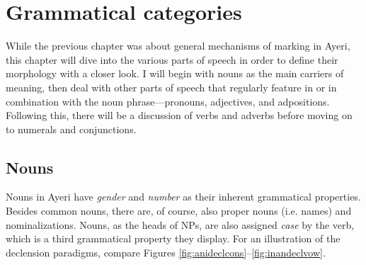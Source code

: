 
\chapter{Grammatical categories}

While the previous chapter was about general mechanisms of marking in Ayeri, 
this chapter will dive into the various parts of speech in order to define 
their morphology with a closer look. I will begin with nouns as the main 
carriers of meaning, then deal with other parts of speech that regularly 
feature in or in combination with the noun phrase---pronouns, adjectives, and 
adpositions. Following this, there will be a discussion of verbs and adverbs 
before moving on to numerals and conjunctions.

\section{Nouns}
\label{sec:nouns}

Nouns in Ayeri have \emph{gender} and \emph{number} as their inherent 
grammatical properties. Besides common nouns, there are, of course, also proper 
nouns (i.e. names) and nominalizations. Nouns, as the heads of NPs, are also 
assigned \emph{case} by the verb, which is a third grammatical property they 
display. For an illustration of the declension paradigms, compare Figures 
\ref{fig:anideclcons}–\ref{fig:inandeclvow}.

